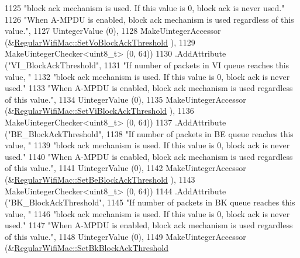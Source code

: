 \begin{DoxyCode}
1125                    \textcolor{stringliteral}{"block ack mechanism is used. If this value is 0, block ack is never used."}
1126                    \textcolor{stringliteral}{"When A-MPDU is enabled, block ack mechanism is used regardless of this value."},
1127                    UintegerValue (0),
1128                    MakeUintegerAccessor (&\hyperlink{classns3_1_1RegularWifiMac_a57a6d060a150969619a9477a0ccbb49d}{RegularWifiMac::SetVoBlockAckThreshold}
      ),
1129                    MakeUintegerChecker<uint8\_t> (0, 64))
1130     .AddAttribute (\textcolor{stringliteral}{"VI\_BlockAckThreshold"},
1131                    \textcolor{stringliteral}{"If number of packets in VI queue reaches this value, "}
1132                    \textcolor{stringliteral}{"block ack mechanism is used. If this value is 0, block ack is never used."}
1133                    \textcolor{stringliteral}{"When A-MPDU is enabled, block ack mechanism is used regardless of this value."},
1134                    UintegerValue (0),
1135                    MakeUintegerAccessor (&\hyperlink{classns3_1_1RegularWifiMac_a003eb9b1b39038d0bab3725a18a03895}{RegularWifiMac::SetViBlockAckThreshold}
      ),
1136                    MakeUintegerChecker<uint8\_t> (0, 64))
1137     .AddAttribute (\textcolor{stringliteral}{"BE\_BlockAckThreshold"},
1138                    \textcolor{stringliteral}{"If number of packets in BE queue reaches this value, "}
1139                    \textcolor{stringliteral}{"block ack mechanism is used. If this value is 0, block ack is never used."}
1140                    \textcolor{stringliteral}{"When A-MPDU is enabled, block ack mechanism is used regardless of this value."},
1141                    UintegerValue (0),
1142                    MakeUintegerAccessor (&\hyperlink{classns3_1_1RegularWifiMac_ab026ece3a3a3e3b9b66132d4d91589c1}{RegularWifiMac::SetBeBlockAckThreshold}
      ),
1143                    MakeUintegerChecker<uint8\_t> (0, 64))
1144     .AddAttribute (\textcolor{stringliteral}{"BK\_BlockAckThreshold"},
1145                    \textcolor{stringliteral}{"If number of packets in BK queue reaches this value, "}
1146                    \textcolor{stringliteral}{"block ack mechanism is used. If this value is 0, block ack is never used."}
1147                    \textcolor{stringliteral}{"When A-MPDU is enabled, block ack mechanism is used regardless of this value."},
1148                    UintegerValue (0),
1149                    MakeUintegerAccessor (&\hyperlink{classns3_1_1RegularWifiMac_a4f57767c82eb4aaced365acda69d8974}{RegularWifiMac::SetBkBlockAckThreshold}

\end{DoxyCode}
